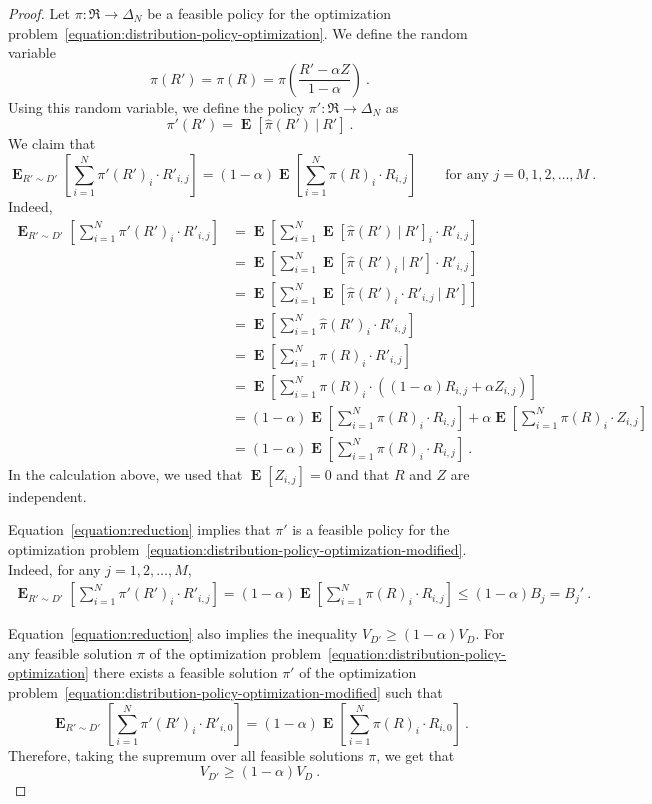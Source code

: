 \documentclass[12pt]{article}
\newcommand{\Requests}{\mathfrak{R}}
\DeclareMathOperator*{\Exp}{\mathbf{E}}
\theoremstyle{definition}
\begin{document}
\begin{proof}
Let $\pi:\Requests \to \Delta_N$ be a feasible policy for the optimization
problem~\eqref{equation:distribution-policy-optimization}. We define the random
variable
$$
\widehat{\pi}(R') = \pi(R) = \pi \left( \frac{R' - \alpha Z}{1-\alpha} \right) \: .
$$
Using this random variable, we define the policy $\pi':\Requests \to \Delta_N$ as
$$
\pi'(R') = \Exp[ \widehat{\pi}(R') ~|~ R' ] \: .
$$
We claim that
\begin{equation}
\label{equation:reduction}
\Exp_{R' \sim D'} \left[ \sum_{i=1}^N \pi'(R')_i \cdot R'_{i,j} \right] =  (1 - \alpha) \Exp \left[ \sum_{i=1}^N \pi(R)_i \cdot R_{i,j} \right] \qquad \text{for any $j=0,1,2,\dots,M$} \: .
\end{equation}
Indeed,
\begin{align*}
\Exp_{R' \sim D'} \left[ \sum_{i=1}^N \pi'(R')_i \cdot R'_{i,j} \right]
& = \Exp \left[ \sum_{i=1}^N \Exp[ \widehat{\pi}(R') ~|~ R' ]_i \cdot R'_{i,j} \right] \\
& = \Exp \left[ \sum_{i=1}^N \Exp[ \widehat{\pi}(R')_i ~|~ R' ] \cdot R'_{i,j} \right] \\
& = \Exp \left[ \sum_{i=1}^N \Exp[ \widehat{\pi}(R')_i \cdot R'_{i,j} ~|~ R' ] \right] \\
& = \Exp \left[ \sum_{i=1}^N \widehat{\pi}(R')_i \cdot R'_{i,j} \right] \\
& = \Exp \left[ \sum_{i=1}^N \pi(R)_i \cdot R'_{i,j} \right] \\
& = \Exp \left[ \sum_{i=1}^N \pi(R)_i \cdot \left( (1 - \alpha) R_{i,j} + \alpha Z_{i,j} \right) \right] \\
& = (1 - \alpha) \Exp \left[ \sum_{i=1}^N \pi(R)_i \cdot R_{i,j} \right]  + \alpha \Exp \left[ \sum_{i=1}^N \pi(R)_i \cdot Z_{i,j} \right] \\
& = (1 - \alpha) \Exp \left[ \sum_{i=1}^N \pi(R)_i \cdot R_{i,j} \right] \: .
\end{align*}
In the calculation above, we used that $\Exp[ Z_{i,j} ] = 0$ and that $R$ and
$Z$ are independent.

Equation~\eqref{equation:reduction} implies that $\pi'$ is a feasible policy for
the optimization
problem~\eqref{equation:distribution-policy-optimization-modified}. Indeed, for
any $j=1,2,\dots,M$,
\begin{align*}
\Exp_{R' \sim D'} \left[ \sum_{i=1}^N \pi'(R')_i \cdot R'_{i,j} \right]
=  (1 - \alpha) \Exp \left[ \sum_{i=1}^N \pi(R)_i \cdot R_{i,j} \right]
\le (1 - \alpha) B_j
= B_j' \: .
\end{align*}

Equation~\eqref{equation:reduction} also implies the inequality $V_{D'} \ge (1 -
\alpha) V_D$. For any feasible solution $\pi$ of the optimization
problem~\eqref{equation:distribution-policy-optimization} there exists a
feasible solution $\pi'$ of the optimization
problem~\eqref{equation:distribution-policy-optimization-modified} such that
$$
\Exp_{R' \sim D'} \left[ \sum_{i=1}^N \pi'(R')_i \cdot R'_{i,0} \right] =  (1 - \alpha) \Exp \left[ \sum_{i=1}^N \pi(R)_i \cdot R_{i,0} \right] \: .
$$
Therefore, taking the supremum over all feasible solutions $\pi$, we get that
$$
V_{D'} \ge (1 - \alpha) V_D \: .
$$
\end{proof}
\end{document}
